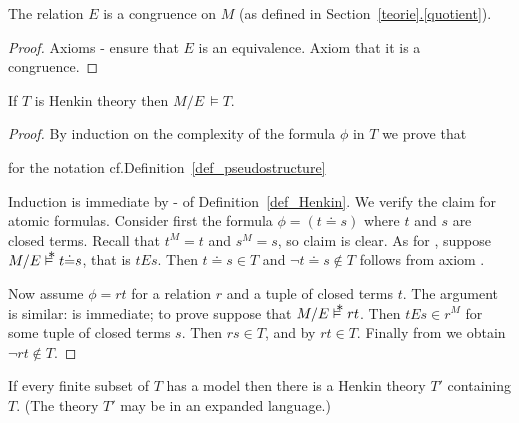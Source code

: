 \documentclass[creche.tex]{subfiles}
\begin{document}
\begin{lemma}
The relation $E$ is a congruence on $M$ (as defined in Section~\hyperref[quotient]{\ref*{teorie}.\ref*{quotient}}).
\end{lemma}

\begin{proof}
Axioms - ensure that $E$ is an equivalence. Axiom  that it is a congruence.
\end{proof}

\begin{theorem}
If $T$ is Henkin theory then $M/E\,\models T$. 
\end{theorem}

\begin{proof}
By induction on the complexity of the formula $\phi$ in $T$ we prove that

\hfill for the notation cf.\@ Definition~\ref{def_pseudostructure}


Induction is immediate by - of Definition~\ref{def_Henkin}. We verify the claim for atomic formulas. Consider first the formula $\phi= (t{\doteq}s)$ where $t$ and $s$ are closed terms. Recall that $t^M=t$ and $s^M=s$, so claim  is clear. As for , suppose $M/E\pmodels t{\doteq}s$, that is  $tEs$. Then $t{\doteq}s\in T$ and $\neg t{\doteq}s\notin T$ follows from axiom .

Now assume $\phi=rt$ for a relation $r$ and a tuple of closed terms $t$. The argument is similar:  is immediate; to prove  suppose that $M/E\pmodels rt$. Then $tEs\in r^M$ for some tuple of closed terms $s$. Then $rs\in T$, and by  $rt\in T$. Finally from  we obtain $\neg rt\notin T$.
\end{proof}

\begin{proposition}If every finite subset of $T$ has a model then there is a Henkin theory $T'$ containing $T$. (The theory $T'$ may be in an expanded language.)
\end{proposition}
\end{document}

